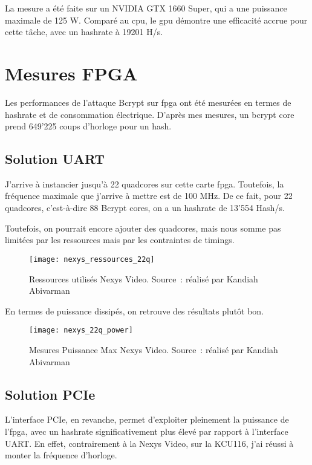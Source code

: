 La mesure a été faite sur un NVIDIA GTX 1660 Super, qui a une puissance maximale de 125 W.
Comparé au \gls{cpu}, le \gls{gpu} démontre une efficacité accrue pour cette tâche, avec un hashrate à 19201 H/s.

\section{Mesures FPGA}

Les performances de l'attaque Bcrypt sur \gls{fpga} ont été mesurées en termes de hashrate et de consommation électrique. 
D'après mes mesures, un bcrypt core prend 649'225 coups d'horloge pour un hash.

\subsection{Solution UART}

J'arrive à instancier jusqu'à 22 quadcores sur cette carte \gls{fpga}.
Toutefois, la fréquence maximale que j'arrive à mettre est de 100 MHz.
De ce fait, pour 22 quadcores, c'est-à-dire 88 Bcrypt cores, on a un hashrate de 13'554 Hash/s.

Toutefois, on pourrait encore ajouter des quadcores, mais nous somme pas limitées par les ressources mais par les contraintes de timings.

\begin{figure}[tbph!]
	\centering
	\texttt{[image: nexys\_ressources\_22q]}
	\caption[Ressources utilisés Nexys Video]{Ressources utilisés Nexys Video. Source : réalisé par Kandiah Abivarman}
	\label{fig:nexys_ressources_22q}
\end{figure}

En termes de puissance dissipés, on retrouve des résultats plutôt bon.

\begin{figure}[tbph!]
	\centering
	\texttt{[image: nexys\_22q\_power]}
	\caption[Mesures Puissance Max Nexys Video]{Mesures Puissance Max Nexys Video. Source : réalisé par Kandiah Abivarman}
	\label{fig:nexys_22q_power}
\end{figure}

\newpage

\subsection{Solution PCIe}

L'interface PCIe, en revanche, permet d'exploiter pleinement la puissance de l'\gls{fpga}, avec un hashrate significativement plus élevé par rapport à l'interface UART. 
En effet, contrairement à la Nexys Video, sur la KCU116, j'ai réussi à monter la fréquence d'horloge.

